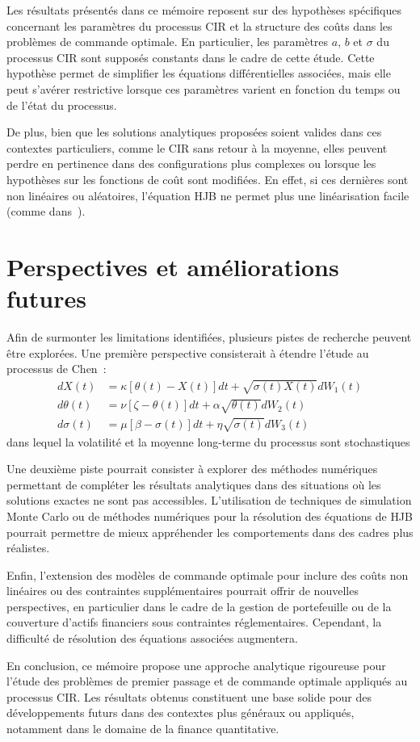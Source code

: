 Les résultats présentés dans ce mémoire reposent sur des hypothèses spécifiques concernant les paramètres du processus CIR et la structure des coûts dans les problèmes de commande optimale. En particulier, les paramètres \(a\), \(b\) et \(\sigma\) du processus \acs{CIR} sont supposés constants dans le cadre de cette étude. Cette hypothèse permet de simplifier les équations différentielles associées, mais elle peut s'avérer restrictive lorsque ces paramètres varient en fonction du temps ou de l'état du processus. 

De plus, bien que les solutions analytiques proposées soient valides dans ces contextes particuliers, comme le \acs{CIR} sans retour à la moyenne, elles peuvent perdre en pertinence dans des configurations plus complexes ou lorsque les hypothèses sur les fonctions de coût sont modifiées. En effet, si ces dernières sont non linéaires ou aléatoires, l'équation \acs{HJB} ne permet plus une linéarisation facile (comme dans~\cite{whittle1982}).

\section{Perspectives et améliorations futures}

Afin de surmonter les limitations identifiées, plusieurs pistes de recherche peuvent être explorées. Une première perspective consisterait à étendre l'étude au processus de Chen~\cite{chen1996}:
\[
\begin{aligned}
    dX(t) &= \kappa[\theta(t)-X(t)]dt+\sqrt{\sigma(t)X(t)}dW_1(t) \\
    d\theta(t) &= \nu[\zeta-\theta(t)]dt+\alpha\sqrt{\theta(t)}dW_2(t) \\
    d\sigma(t) &= \mu[\beta-\sigma(t)]dt+\eta\sqrt{\sigma(t)}dW_3(t)
\end{aligned}
\]
dans lequel la volatilité et la moyenne long-terme du processus sont stochastiques

Une deuxième piste pourrait consister à explorer des méthodes numériques permettant de compléter les résultats analytiques dans des situations où les solutions exactes ne sont pas accessibles. L'utilisation de techniques de simulation Monte Carlo ou de méthodes numériques pour la résolution des équations de \acs{HJB} pourrait permettre de mieux appréhender les comportements dans des cadres plus réalistes.

Enfin, l'extension des modèles de commande optimale pour inclure des coûts non linéaires ou des contraintes supplémentaires pourrait offrir de nouvelles perspectives, en particulier dans le cadre de la gestion de portefeuille ou de la couverture d'actifs financiers sous contraintes réglementaires. Cependant, la difficulté de résolution des équations associées augmentera.

En conclusion, ce mémoire propose une approche analytique rigoureuse pour l'étude des problèmes de premier passage et de commande optimale appliqués au processus \acs{CIR}. Les résultats obtenus constituent une base solide pour des développements futurs dans des contextes plus généraux ou appliqués, notamment dans le domaine de la finance quantitative.